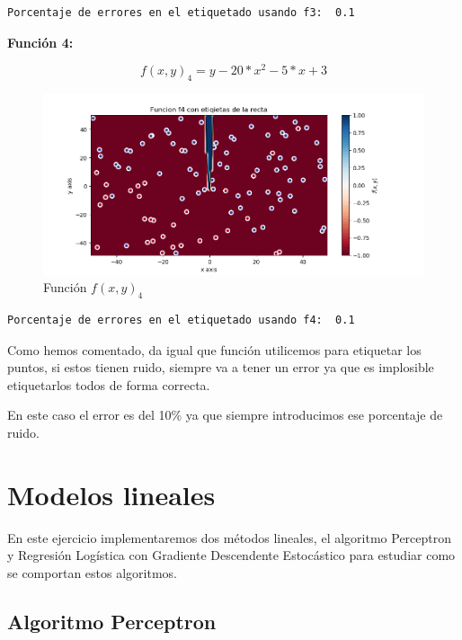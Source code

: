 \documentclass[12pt, spanish]{article}
\begin{document}
\begin{lstlisting}
Porcentaje de errores en el etiquetado usando f3:  0.1
\end{lstlisting}


\textbf{Función 4:} 

$$ f(x, y)_4 = y - 20*x^2 -5*x +3  $$

\begin{figure}[H]
  \centering
      \includegraphics[scale = 0.70]{ej1-3-f4-etiq.png}
 		 \caption{Función $f(x, y)_4$}
  		\label{fig:ej1-f4}

\end{figure}

\begin{lstlisting}
Porcentaje de errores en el etiquetado usando f4:  0.1
\end{lstlisting}

Como hemos comentado, da igual que función utilicemos para etiquetar los puntos, si estos tienen ruido, siempre va a tener un error ya que es implosible etiquetarlos todos de forma correcta.

En este caso el error es del 10\% ya que siempre introducimos ese porcentaje de ruido.

\newpage

\section{Modelos lineales}

En este ejercicio implementaremos dos métodos lineales, el algoritmo Perceptron y Regresión Logística con Gradiente Descendente Estocástico para estudiar como se comportan estos algoritmos.

\subsection{Algoritmo Perceptron}
\end{document}
